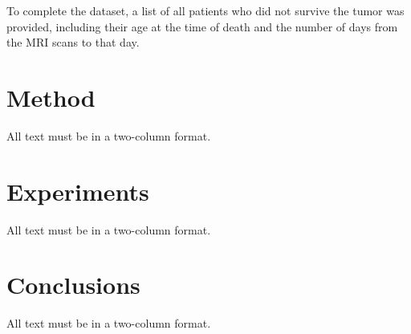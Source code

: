 \documentclass[10pt,twocolumn,letterpaper]{article}
\begin{document}
To complete the dataset, a list of all patients who did not survive the tumor was provided, including their age at the time of death and the number of days from the MRI scans to that day.

\section{Method}

All text must be in a two-column format. 

\section{Experiments}

All text must be in a two-column format. 

\section{Conclusions}

All text must be in a two-column format. 


{\small


}
\end{document}
